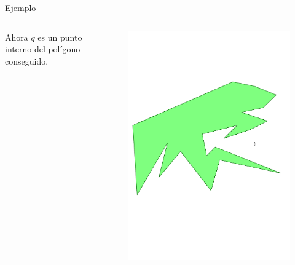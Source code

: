 \documentclass[aspectratio=169,xcolor=dvipsnames, t]{beamer}
\begin{document}
\begin{frame}{Ejemplo}
  \begin{columns}
    \begin{column}{0.3\textwidth}
      \raggedright %
      Ahora $q$ es un punto interno del polígono conseguido.
    \end{column}
    \begin{column}{0.7\textwidth}
      \vspace{-2.5cm} %
      \begin{figure}
        \centering
        \includegraphics[width=1\linewidth, height=.95\textheight, page=6, keepaspectratio]{IPE/point_visibility.pdf}
      \end{figure}
    \end{column}
  \end{columns}
\end{frame}
\end{document}
